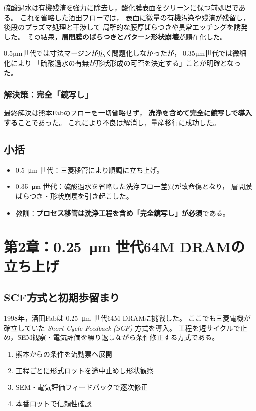 \documentclass[conference]{IEEEtran}
\let\meter\metre
\begin{document}
硫酸過水は有機残渣を強力に除去し，酸化膜表面をクリーンに保つ前処理である。
これを省略した酒田フローでは，
表面に微量の有機汚染や残渣が残留し，
後段のプラズマ処理と干渉して
局所的な膜厚ばらつきや異常エッチングを誘発した。
その結果，\textbf{層間膜のばらつきとパターン形状崩壊}が顕在化した。

0.5µm世代では寸法マージンが広く問題化しなかったが，
0.35µm世代では微細化により
「硫酸過水の有無が形状形成の可否を決定する」ことが明確となった。

\subsubsection*{解決策：完全「鏡写し」}
最終解決は熊本Fabのフローを一切省略せず，
\textbf{洗浄を含めて完全に鏡写しで導入する}ことであった。
これにより不良は解消し，量産移行に成功した。

\subsection{小括}
\begin{itemize}
  \item \SI{0.5}{\micro\meter} 世代：三菱移管により順調に立ち上げ。
  \item \SI{0.35}{\micro\meter} 世代：硫酸過水を省略した洗浄フロー差異が致命傷となり，
        層間膜ばらつき・形状崩壊を引き起こした。
  \item 教訓：\textbf{プロセス移管は洗浄工程を含め「完全鏡写し」が必須}である。
\end{itemize}

\section{第2章：\texorpdfstring{\SI{0.25}{\micro\meter}}{0.25μm} 世代64M DRAMの立ち上げ}

\subsection{SCF方式と初期歩留まり}
1998年，酒田Fabは \SI{0.25}{\micro\meter} 世代64M DRAMに挑戦した。
ここでも三菱電機が確立していた \emph{Short Cycle Feedback (SCF)} 方式を導入。
工程を短サイクルで止め，SEM観察・電気評価を繰り返しながら条件修正する方式である。

\begin{enumerate}
  \item 熊本からの条件を流動票へ展開
  \item 工程ごとに形式ロットを途中止めし形状観察
  \item SEM・電気評価フィードバックで逐次修正
  \item 本番ロットで信頼性確認
\end{enumerate}
\end{document}
